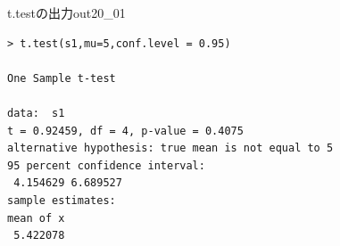 \begin{Rscreen}{t.testの出力}{out20_01}
	\begin{verbatim}
> t.test(s1,mu=5,conf.level = 0.95)

One Sample t-test

data:  s1
t = 0.92459, df = 4, p-value = 0.4075
alternative hypothesis: true mean is not equal to 5
95 percent confidence interval:
 4.154629 6.689527
sample estimates:
mean of x 
 5.422078
\end{verbatim}
\end{Rscreen}
